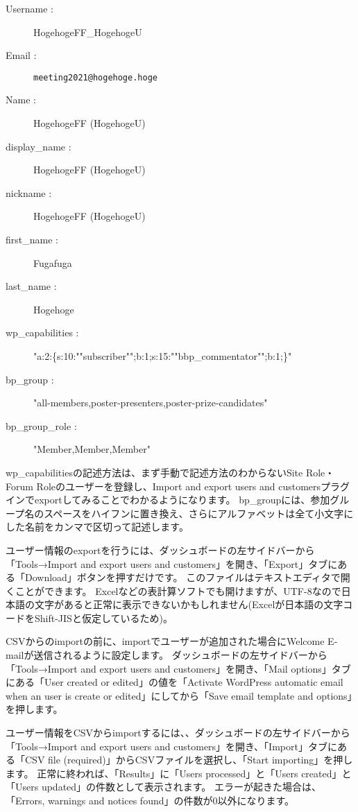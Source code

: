 \documentclass[titlepage,10pt,a4paper,uplatex]{jsbook}
\begin{document}
\begin{description}
\item[Username : ] HogehogeFF\_HogehogeU
\item[Email : ] \texttt{meeting2021@hogehoge.hoge}
\item[Name : ] HogehogeFF (HogehogeU)
\item[display\_name : ] HogehogeFF (HogehogeU)
\item[nickname : ] HogehogeFF (HogehogeU)
\item[first\_name : ] Fugafuga
\item[last\_name : ] Hogehoge
\item[wp\_capabilities : ] "a:2:\{s:10:""subscriber"";b:1;s:15:""bbp\_commentator"";b:1;\}"
\item[bp\_group : ] "all-members,poster-presenters,poster-prize-candidates"
\item[bp\_group\_role : ] "Member,Member,Member"
\end{description}

wp\_capabilitiesの記述方法は、まず手動で記述方法のわからないSite Role・Forum Roleのユーザーを登録し、Import and export users and customersプラグインでexportしてみることでわかるようになります。
bp\_groupには、参加グループ名のスペースをハイフンに置き換え、さらにアルファベットは全て小文字にした名前をカンマで区切って記述します。

ユーザー情報のexportを行うには、ダッシュボードの左サイドバーから「Tools→Import and export users and customers」を開き、「Export」タブにある「Download」ボタンを押すだけです。
このファイルはテキストエディタで開くことができます。
Excelなどの表計算ソフトでも開けますが、UTF-8なので日本語の文字があると正常に表示できないかもしれません(Excelが日本語の文字コードをShift-JISと仮定しているため)。

CSVからのimportの前に、importでユーザーが追加された場合にWelcome E-mailが送信されるように設定します。
ダッシュボードの左サイドバーから「Tools→Import and export users and customers」を開き、「Mail options」タブにある「User created or edited」の値を「Activate WordPress automatic email when an user is create or edited」にしてから「Save email template and options」を押します。

ユーザー情報をCSVからimportするには、、ダッシュボードの左サイドバーから「Tools→Import and export users and customers」を開き、「Import」タブにある「CSV file (required)」からCSVファイルを選択し、「Start importing」を押します。
正常に終われば、「Results」に「Users processed」と「Users created」と「Users updated」の件数として表示されます。
エラーが起きた場合は、「Errors, warnings and notices found」の件数が0以外になります。
\end{document}
